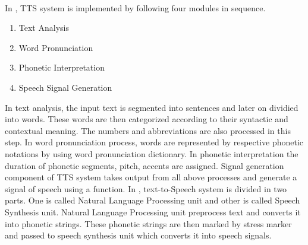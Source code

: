 \\
In \cite{liberman1992text}, TTS system is implemented by following four modules in
sequence.

\begin{enumerate}
  \item Text Analysis
  \item Word Pronunciation
  \item Phonetic Interpretation
  \item Speech Signal Generation
\end{enumerate}

In text analysis, the input text is segmented into sentences and later on dividied into words.
These words are then categorized according to their syntactic and contextual meaning. The
numbers and abbreviations are also processed in this step. In word pronunciation process, words
are represented by respective phonetic notations by using word pronunciation dictionary. In
phonetic interpretation the duration of phonetic segments, pitch, accents are assigned. Signal
generation component of TTS system takes output from all above processes and generate a signal
of speech using a function. In \cite{urdu_text_preprocessing}, text-to-Speech system is divided in
two parts. One is called Natural Language Processing unit and other is called Speech Synthesis
unit. Natural Language Processing unit preprocess text and converts it into phonetic strings. These
phonetic strings are then marked by stress marker and passed to speech synthesis unit which
converts it into speech signals.